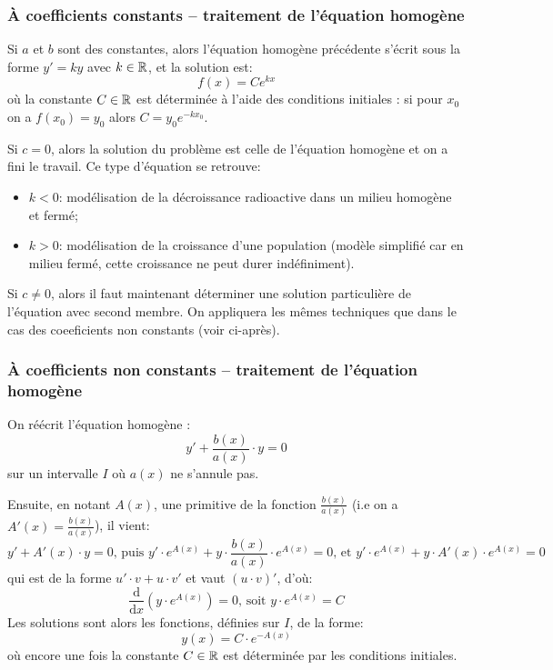 \medskip
\subsubsection{À coefficients constants -- traitement de l'équation homogène}

Si $a$ et $b$ sont des constantes, alors l'équation homogène précédente s'écrit 
sous la forme $y' = ky$ avec $k\in\mathbb R$, et la solution est:
\begin{equation}
    f(x) = Ce^{kx}
\end{equation}
où la constante $C\in\mathbb R$ est déterminée à l'aide des conditions initiales : 
si pour $x_0$ on a $f(x_0) = y_0$ alors $C = y_0e^{-kx_0}$.

\medskip
Si $c=0$, alors la solution du problème est celle de l'équation homogène et on a fini
le travail. Ce type d'équation se retrouve:
\begin{itemize}
    \item $k<0$: modélisation de la décroissance radioactive dans un milieu homogène et fermé;
    \item $k>0$: modélisation de la croissance d'une population (modèle simplifié car en milieu
	fermé, cette croissance ne peut durer indéfiniment).
\end{itemize}

\medskip
Si $c\ne0$, alors il faut maintenant déterminer une solution particulière de l'équation avec
second membre. On appliquera les mêmes techniques que dans le cas des coeeficients non 
constants (voir ci-après).


\medskip
\subsubsection{À coefficients non constants -- traitement de l'équation homogène}

On réécrit l'équation homogène :
\begin{equation}
    y' + \frac{b(x)}{a(x)} \cdot y = 0
\end{equation}
sur un intervalle $I$ où $a(x)$ ne s'annule pas.

Ensuite, en notant $A(x)$, une primitive de la fonction $\frac{b(x)}{a(x)}$ (i.e on a 
$A'(x) = \frac{b(x)}{a(x)}$), il vient:
\begin{equation}
    y' + A'(x) \cdot y =0 
\text{, puis }
    y' \cdot e^{A(x)} + y \cdot \frac{b(x)}{a(x)} \cdot e^{A(x)} =0
\text{, et }
    y' \cdot e^{A(x)} + y \cdot A'(x) \cdot e^{A(x)}=0
\end{equation}
qui est de la forme $u' \cdot v + u \cdot v'$ et vaut $ (u \cdot v)'$, d'où:
\begin{equation}
    \frac{\mathrm d}{\mathrm dx}(y \cdot e^{A(x)})=0
\text{, soit }
    y \cdot e^{A(x)} = C
\end{equation}
Les solutions sont alors les fonctions, définies sur $I$, de la forme:
\begin{equation}
    y(x) = C \cdot e^{-A(x)}
\end{equation}
où encore une fois la constante $C\in\mathbb R$ est déterminée par les conditions initiales.

